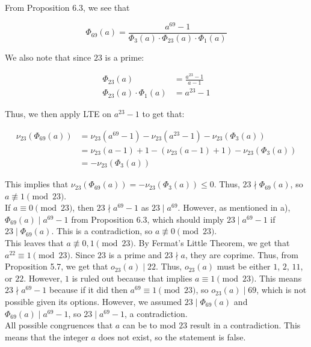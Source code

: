 \documentclass{article}
\begin{document}
\begin{enumerate}
\begin{enumerate}
    From Proposition 6.3, we see that 

    $$\Phi_{69}(a) = \frac{a^{69} - 1}{\Phi_3(a) \cdot  \Phi_{23}(a) \cdot \Phi_1(a)} $$

    We also note that since $23$ is a prime: 

    \begin{align*}
        \Phi_{23}(a) &= \frac{a^{23} - 1}{ a - 1} \\
        \Phi_{23}(a) \cdot \Phi_1(a) &= a^{23} - 1
    \end{align*}

    Thus, we then apply LTE on $a^{23} - 1$ to get that: 

    \begin{align*}
        \nu_{23}(\Phi_{69}(a)) &= 
        \nu_{23}(a^{69} - 1) - \nu_{23}(a^{23} - 1) - \nu_{23}(\Phi_3(a))\\
        &= \nu_{23}(a- 1) + 1 - (\nu_{23}(a- 1) + 1) - \nu_{23}(\Phi_3(a)) \\
        &= -\nu_{23}(\Phi_{3}(a))
    \end{align*}

    This implies that $\nu_{23}(\Phi_{69}(a)) = -\nu_{23}(\Phi_{3}(a)) \leq 0$. Thus, $23 \nmid \Phi_{69}(a)$, so $a \not\equiv 1 \pmod{23}$. \\

    If $a \equiv 0 \pmod{23}$, then $23 \nmid a^{69} - 1$ as $23 \mid a^{69}$. However, as mentioned in a), $\Phi_{69}(a) \mid a^{69} - 1$ from Proposition 6.3, which should imply $23 \mid a^{69} - 1$ if $23 \mid \Phi_{69}(a)$. This is a contradiction, so $a \not\equiv 0 \pmod{23}$. \\

    This leaves that $a \not\equiv 0, 1 \pmod{23}$. By Fermat's Little Theorem, we get that $a^{22} \equiv 1 \pmod{23}$. Since $23$ is a prime and $23 \nmid a$, they are coprime. Thus, from Proposition 5.7, we get that $o_{23}(a) \mid 22$. Thus, $o_{23}(a)$ must be either $1$, $2$, $11$, or $22$. However, $1$ is ruled out because that implies $a \equiv 1 \pmod{23}$. This means $23 \nmid a^{69} - 1$ because if it did then $a^{69} \equiv 1 \pmod{23}$, so $o_{23}(a) \mid 69$, which is not possible given its options. However, we assumed $23 \mid \Phi_{69}(a)$ and $\Phi_{69}(a) \mid a^{69} - 1$, so $23 \mid a^{69} - 1$, a contradiction. \\

    All possible congruences that $a$ can be to mod $23$ result in a contradiction. This means that the integer $a$ does not exist, so the statement is false. \\


\end{enumerate}
\end{enumerate}
\end{document}
